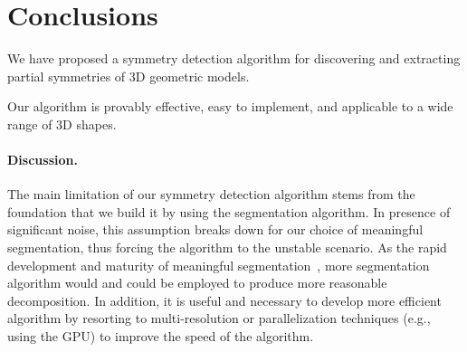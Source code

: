\section{Conclusions}
\label{sec:con}

We have proposed a symmetry detection algorithm for discovering and extracting partial symmetries of 3D geometric models.

Our algorithm is provably effective, easy to implement, and applicable to a wide range of 3D shapes.

\paragraph{Discussion.} 
The main limitation of our symmetry detection algorithm stems from the foundation that we build it by using the segmentation algorithm.
In presence of significant noise, this assumption breaks down for our choice of meaningful segmentation, 
thus forcing the algorithm to the unstable scenario.
As the rapid development and maturity of meaningful segmentation~\cite{Shamir2008}, 
more segmentation algorithm would and could be employed to produce more reasonable decomposition.
In addition, it is useful and necessary to develop more efficient algorithm by resorting to multi-resolution or parallelization
techniques (e.g., using the GPU) to improve the speed of the algorithm.
